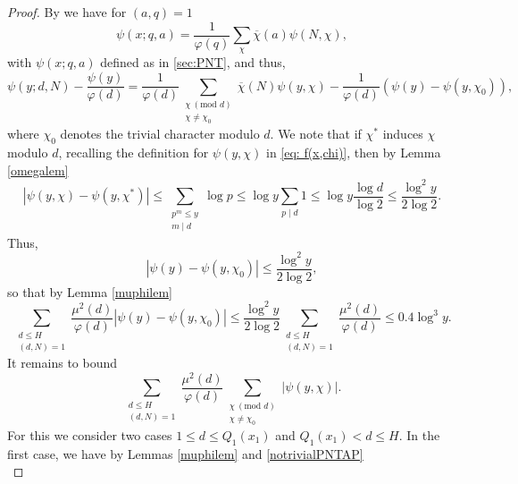 \documentclass[12pt]{amsart}
\begin{document}
\begin{proof}
    By \cite[(11.22)]{M-V2} we have for $(a,q)=1$
    \begin{equation*}
        \psi(x;q,a) = \frac{1}{\varphi(q)} \sum_{\chi} \overline{\chi}(a) \psi(N, \chi),
    \end{equation*}
    with $\psi(x;q,a)$ defined as in \eqref{sec:PNT}, and thus,
    \begin{equation*}
        \psi(y;d,N)-\frac{\psi(y)}{\varphi(d)} =
        \frac{1}{\varphi(d)} \sum_{\substack{\chi \: (\text{mod }d) \\ \chi \ne \chi_0}} \overline{\chi}(N) \psi(y, \chi) - \frac{1}{\varphi(d)}(\psi(y) - \psi(y, \chi_0)),
    \end{equation*}
    where $\chi_0$ denotes the trivial character modulo $d$. We note that if $\chi^*$ induces $\chi$ modulo $d$, recalling the definition for $\psi(y,\chi)$ in \eqref{eq: f(x,chi)}, then by Lemma \ref{omegalem}
    \begin{equation}\label{induceeq}
        \left|\psi(y,\chi)-\psi(y,\chi^*)\right|\le
        \sum_{\substack{p^m\le y\\m\mid d}}\log p\le\log y\sum_{p\mid d}1\le\log y\frac{\log d}{\log 2} \le \frac{\log^2 y}{2 \log 2}.
    \end{equation}
    Thus,
    \begin{equation*}
        |\psi(y) - \psi(y, \chi_0)| \le\frac{\log^2 y}{2 \log 2},
    \end{equation*}
    so that by Lemma \ref{muphilem}
    \begin{equation} \label{eq: psi(y)-psi(y,chi_0)}
        \sum_{\substack{d\le H\\(d,N)=1}} \frac{\mu^2(d)}{\varphi(d)}|\psi(y) - \psi(y, \chi_0)| \le \frac{\log^2 y}{2 \log 2}
        \sum_{\substack{d\le H\\(d,N)=1}} \frac{\mu^2(d)}{\varphi(d)} \le 0.4\log^3 y.
    \end{equation}
    It remains to bound
    \begin{equation*}
        \sum_{\substack{d\le H\\(d,N)=1}} \frac{\mu^2(d)}{\varphi(d)} \sum_{\substack{\chi \: (\text{mod }d) \\ \chi \ne \chi_0}} |\psi(y, \chi)|.
    \end{equation*}
    For this we consider two cases $1\le d\le Q_1(x_1)$ and $Q_1(x_1)<d\le H$. In the first case, we have by Lemmas \ref{muphilem} and \ref{notrivialPNTAP}
    \begin{equation} \label{eq: sum_psi(y,chi)}

\end{equation}
\end{proof}
\end{document}
